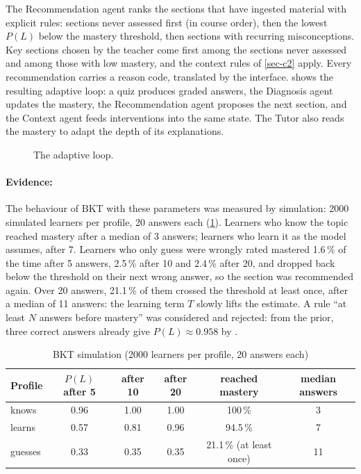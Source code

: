 The Recommendation agent ranks the sections that have ingested material
with explicit rules: sections never assessed first (in course order), then
the lowest $P(L)$ below the mastery threshold, then sections with
recurring misconceptions. Key sections chosen by the teacher come first
among the sections never assessed and among those with low mastery, and
the context rules of \cref{sec-c2} apply. Every
recommendation carries a reason code, translated by the interface.
 shows the resulting adaptive loop: a quiz
produces graded answers, the Diagnosis agent updates the mastery, the
Recommendation agent proposes the next section, and the Context agent
feeds interventions into the same state. The Tutor also reads the mastery
to adapt the depth of its explanations.

\begin{figure}[htbp]
  \centering
  \caption{The adaptive loop.}
  \label{fig-adaptive-loop}
\end{figure}

\paragraph{Evidence:} The behaviour of BKT with these parameters was
measured by simulation: 2000 simulated learners per profile, 20 answers
each (\cref{tab-bkt-sim}). Learners who know the topic reached mastery
after a median of 3 answers; learners who learn it as the model assumes,
after 7. Learners who only guess were wrongly rated mastered 1.6\,\% of
the time after 5 answers, 2.5\,\% after 10 and 2.4\,\% after 20, and
dropped back below the threshold on their next wrong answer, so the
section was recommended again. Over 20 answers, 21.1\,\% of them crossed
the threshold at least once, after a median of 11 answers: the learning
term $T$ slowly lifts the estimate. A rule ``at least $N$ answers before
mastery'' was considered and rejected: from the prior, three correct
answers already give $P(L) \approx 0.958$ by .

\begin{table}[htbp]
\centering
\caption{BKT simulation (2000 learners per profile, 20 answers each)}
\label{tab-bkt-sim}
\small
\begin{tabular}{@{}lccccc@{}}
\toprule
\textbf{Profile} & \textbf{$P(L)$ after 5} & \textbf{after 10} & \textbf{after 20} &
  \textbf{reached mastery} & \textbf{median answers} \\
\midrule
knows   & 0.96 & 1.00 & 1.00 & 100\,\%  & 3 \\
learns  & 0.57 & 0.81 & 0.96 & 94.5\,\% & 7 \\
guesses & 0.33 & 0.35 & 0.35 & 21.1\,\% (at least once) & 11 \\
\bottomrule
\end{tabular}
\end{table}

